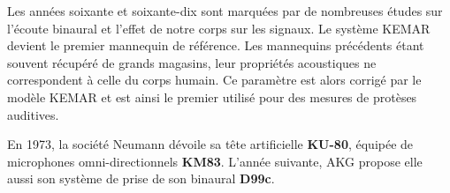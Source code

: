 \documentclass[
  letterpaper,
  DIV=11,
  numbers=noendperiod]{scrreprt}
\begin{document}
Les années soixante et soixante-dix sont marquées par de nombreuses
études sur l'écoute binaural et l'effet de notre corps sur les signaux.
Le système KEMAR devient le premier mannequin de référence. Les
mannequins précédents étant souvent récupéré de grands magasins, leur
propriétés acoustiques ne correspondent à celle du corps humain. Ce
paramètre est alors corrigé par le modèle KEMAR et est ainsi le premier
utilisé pour des mesures de protèses auditives.

En 1973, la société Neumann dévoile sa tête artificielle \textbf{KU-80},
équipée de microphones omni-directionnels \textbf{KM83}. L'année
suivante, AKG propose elle aussi son système de prise de son binaural
\textbf{D99c}.

\begin{figure}

\begin{minipage}[b]{0.33\linewidth}

{\centering 

}
\end{minipage}
\end{figure}
\end{document}
